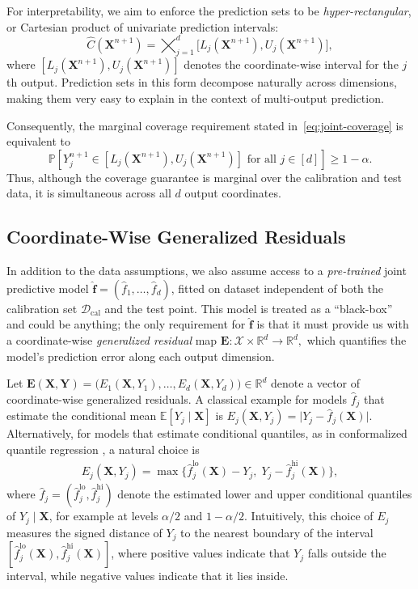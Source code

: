 For interpretability, we aim to enforce the prediction sets to be \emph{hyper-rectangular}, or Cartesian product of univariate prediction  intervals:
\begin{equation} \label{eq:rectangle}
\hat{C}(\mathbf{X}^{n+1}) 
= \bigtimes_{j=1}^d 
\bigl[ L_j(\mathbf{X}^{n+1}), 
       U_j(\mathbf{X}^{n+1}) \bigr],
     \end{equation}
where $[L_j(\mathbf{X}^{n+1}), U_j(\mathbf{X}^{n+1})]$ denotes the coordinate-wise interval for the $j$th output.  
Prediction sets in this form decompose naturally across dimensions, making them very easy to explain in the context of multi-output prediction.  
{\color{blue}Consequently, the marginal coverage
requirement stated in~\eqref{eq:joint-coverage} is equivalent to
\[
\mathbb P\left[
    {Y}_j^{n+1}\in
    [L_j(\mathbf{X}^{n+1}),U_j(\mathbf{X}^{n+1})]
    \text{ for all }j\in[d]
\right]
\geq 1-\alpha.
\]
Thus, although the coverage guarantee is marginal over the calibration and test
data, it is simultaneous across all $d$ output coordinates.


\subsection{Coordinate-Wise Generalized Residuals} \label{sec:residuals}

In addition to the data assumptions, we also assume access to a \emph{pre-trained} joint predictive model $\hat{\mathbf f} = (\hat{f}_1,\ldots,\hat{f}_d)$, fitted on dataset independent of both the calibration set $\mathcal{D}_{\mathrm{cal}}$ and the test point. 
This model is treated as a ``black-box'' and could be anything; the only requirement for $\hat{\mathbf f}$ is that it must provide us with a coordinate-wise \emph{generalized residual} map $\mathbf E : \mathcal{X} \times \mathbb{R}^d \to \mathbb{R}^d,$
which quantifies the model's prediction error along each output dimension.

Let
$\mathbf E(\mathbf X,\mathbf Y)
=
\bigl(
E_1(\mathbf X,Y_1),\ldots,E_d(\mathbf X,Y_d)
\bigr)
\in\mathbb R^d$
denote a vector of coordinate-wise generalized residuals.
A classical example for models $\hat{f}_j$ that estimate the conditional mean $\mathbb{E}[Y_j\mid\mathbf X]$ \citep{lei2018distribution} is $E_j(\mathbf X,Y_j) = \lvert Y_j - \hat{f}_j(\mathbf X) \rvert$.
Alternatively, for models that estimate conditional quantiles, as in conformalized quantile regression \citep{romano2019conformalized}, a natural choice is
\begin{align*}
E_j(\mathbf X,Y_j) = \max \bigl\{\hat{f}_j^{\mathrm{lo}}(\mathbf X) - Y_j,\; Y_j - \hat{f}_j^{\mathrm{hi}}(\mathbf X)\bigr\},
\end{align*}
where $\hat{f}_j = (\hat{f}_j^{\mathrm{lo}}, \hat{f}_j^{\mathrm{hi}})$ denote the estimated lower and upper conditional quantiles of $Y_j\mid \mathbf X$, for example at levels $\alpha/2$ and $1-\alpha/2$. Intuitively, this choice of $E_j$ measures the signed distance of $Y_j$ to the nearest boundary of the  interval $[\hat{f}_j^{\mathrm{lo}}(\mathbf X), \hat{f}_j^{\mathrm{hi}}(\mathbf X)]$, where
positive values indicate that $Y_j$ falls outside the interval, while negative values indicate that it lies inside.

}

